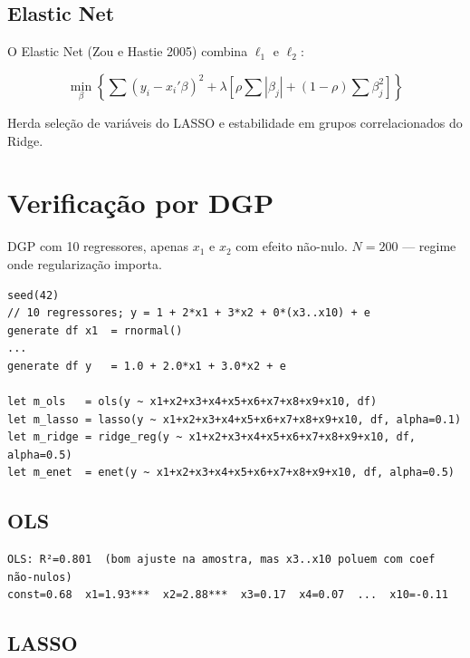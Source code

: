 \subsection*{Elastic Net}

O Elastic Net (Zou e Hastie 2005) combina $\ell_1$ e $\ell_2$:

\[
  \min_\beta \left\{ \sum(y_i - x_i'\beta)^2
  + \lambda \left[\rho\sum|\beta_j| + (1-\rho)\sum\beta_j^2\right] \right\}
\]

Herda seleção de variáveis do LASSO e estabilidade em grupos correlacionados
do Ridge.

\section{Verificação por DGP}

DGP com 10 regressores, apenas $x_1$ e $x_2$ com efeito não-nulo.
$N = 200$ — regime onde regularização importa.

\begin{lstlisting}[caption={DGP esparso — 2 de 10 variáveis ativas}]
seed(42)
// 10 regressores; y = 1 + 2*x1 + 3*x2 + 0*(x3..x10) + e
generate df x1  = rnormal()
...
generate df y   = 1.0 + 2.0*x1 + 3.0*x2 + e

let m_ols   = ols(y ~ x1+x2+x3+x4+x5+x6+x7+x8+x9+x10, df)
let m_lasso = lasso(y ~ x1+x2+x3+x4+x5+x6+x7+x8+x9+x10, df, alpha=0.1)
let m_ridge = ridge_reg(y ~ x1+x2+x3+x4+x5+x6+x7+x8+x9+x10, df, alpha=0.5)
let m_enet  = enet(y ~ x1+x2+x3+x4+x5+x6+x7+x8+x9+x10, df, alpha=0.5)
\end{lstlisting}

\subsection*{OLS}

\begin{lstlisting}[language={}, basicstyle=\ttfamily\small,
  frame=none, numbers=none, backgroundcolor=\color{codbg},
  xleftmargin=0pt, xrightmargin=0pt, breaklines=false]
OLS: R²=0.801  (bom ajuste na amostra, mas x3..x10 poluem com coef não-nulos)
const=0.68  x1=1.93***  x2=2.88***  x3=0.17  x4=0.07  ...  x10=-0.11
\end{lstlisting}

\subsection*{LASSO}

